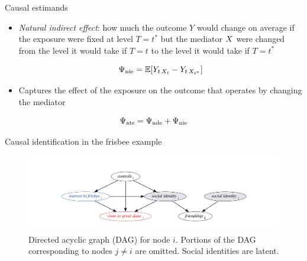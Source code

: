 \documentclass{beamer}
\theoremstyle{remark}
\begin{document}
\begin{frame}{Causal estimands}

    \begin{itemize}
        \item \emph{Natural indirect effect}: how much the outcome $Y$ would change on average if the exposure were fixed at level $T = t^*$ but the mediator $X$ were changed from the level it would take if $T = t$ to the level it would take if $T = t^*$

              \begin{equation*}
                  \nie = \E{Y_{t \, \X_{t}} - Y_{t \, \X_{t^*}}}
              \end{equation*}

        \item Captures the effect of the exposure on the outcome that operates by changing the mediator
    \end{itemize}

    \begin{equation*}
        \Psi_\text{ate} = \Psi_\text{nde} + \Psi_\text{nie}
    \end{equation*}

\end{frame}

\begin{frame}{Causal identification in the frisbee example}

    \centering

    \begin{figure}
        \includegraphics[width=1.2\textwidth]{figures/great-dane.pdf}
        \caption{Directed acyclic graph (DAG) for node $i$. Portions of the DAG corresponding to nodes $j \neq i$ are omitted. Social identities are latent.}
        \label{fig:great-dane}
    \end{figure}

\end{frame}
\end{document}
